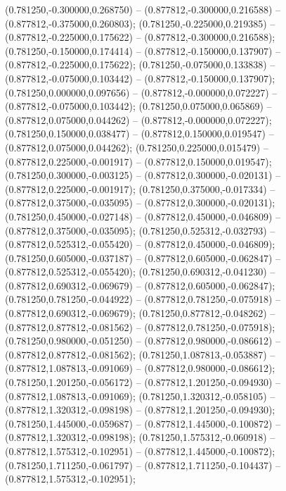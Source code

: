  (0.781250,-0.300000,0.268750) -- (0.877812,-0.300000,0.216588) -- (0.877812,-0.375000,0.260803);
 (0.781250,-0.225000,0.219385) -- (0.877812,-0.225000,0.175622) -- (0.877812,-0.300000,0.216588);
 (0.781250,-0.150000,0.174414) -- (0.877812,-0.150000,0.137907) -- (0.877812,-0.225000,0.175622);
 (0.781250,-0.075000,0.133838) -- (0.877812,-0.075000,0.103442) -- (0.877812,-0.150000,0.137907);
 (0.781250,0.000000,0.097656) -- (0.877812,-0.000000,0.072227) -- (0.877812,-0.075000,0.103442);
 (0.781250,0.075000,0.065869) -- (0.877812,0.075000,0.044262) -- (0.877812,-0.000000,0.072227);
 (0.781250,0.150000,0.038477) -- (0.877812,0.150000,0.019547) -- (0.877812,0.075000,0.044262);
 (0.781250,0.225000,0.015479) -- (0.877812,0.225000,-0.001917) -- (0.877812,0.150000,0.019547);
 (0.781250,0.300000,-0.003125) -- (0.877812,0.300000,-0.020131) -- (0.877812,0.225000,-0.001917);
 (0.781250,0.375000,-0.017334) -- (0.877812,0.375000,-0.035095) -- (0.877812,0.300000,-0.020131);
 (0.781250,0.450000,-0.027148) -- (0.877812,0.450000,-0.046809) -- (0.877812,0.375000,-0.035095);
 (0.781250,0.525312,-0.032793) -- (0.877812,0.525312,-0.055420) -- (0.877812,0.450000,-0.046809);
 (0.781250,0.605000,-0.037187) -- (0.877812,0.605000,-0.062847) -- (0.877812,0.525312,-0.055420);
 (0.781250,0.690312,-0.041230) -- (0.877812,0.690312,-0.069679) -- (0.877812,0.605000,-0.062847);
 (0.781250,0.781250,-0.044922) -- (0.877812,0.781250,-0.075918) -- (0.877812,0.690312,-0.069679);
 (0.781250,0.877812,-0.048262) -- (0.877812,0.877812,-0.081562) -- (0.877812,0.781250,-0.075918);
 (0.781250,0.980000,-0.051250) -- (0.877812,0.980000,-0.086612) -- (0.877812,0.877812,-0.081562);
 (0.781250,1.087813,-0.053887) -- (0.877812,1.087813,-0.091069) -- (0.877812,0.980000,-0.086612);
 (0.781250,1.201250,-0.056172) -- (0.877812,1.201250,-0.094930) -- (0.877812,1.087813,-0.091069);
 (0.781250,1.320312,-0.058105) -- (0.877812,1.320312,-0.098198) -- (0.877812,1.201250,-0.094930);
 (0.781250,1.445000,-0.059687) -- (0.877812,1.445000,-0.100872) -- (0.877812,1.320312,-0.098198);
 (0.781250,1.575312,-0.060918) -- (0.877812,1.575312,-0.102951) -- (0.877812,1.445000,-0.100872);
 (0.781250,1.711250,-0.061797) -- (0.877812,1.711250,-0.104437) -- (0.877812,1.575312,-0.102951);
